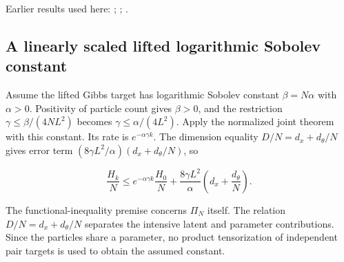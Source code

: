 \documentclass[11pt,a4paper]{report}
\begin{document}
Earlier results used here: \cite[Section~3.1.3]{LangevinLean2026ULALSI}; \cite[Section~3.1.1]{LangevinLean2026IPLA}; \cite[Section~3.3.2]{LangevinLean2026IPLA}.
\subsection{\texorpdfstring{A linearly scaled lifted logarithmic Sobolev constant}{A linearly scaled lifted logarithmic Sobolev constant}}
\label{report-step-IPLA-LSI-UnconditionalTheorem-lean-3}


Assume the lifted Gibbs target has logarithmic Sobolev constant \(\beta=N\alpha\) with \(\alpha>0\). Positivity of particle count gives \(\beta>0\), and the restriction \(\gamma\le\beta/(4NL^2)\) becomes \(\gamma\le\alpha/(4L^2)\). Apply the normalized joint theorem with this constant. Its rate is \(e^{-\alpha\gamma k}\). The dimension equality \(D/N=d_x+d_\theta/N\) gives error term \((8\gamma L^2/\alpha)(d_x+d_\theta/N)\), so

\[\frac{H_k}{N}\le e^{-\alpha\gamma k}\frac{H_0}{N}+\frac{8\gamma L^2}{\alpha}\left(d_x+\frac{d_\theta}{N}\right).\]

The functional-inequality premise concerns \(\Pi_N\) itself. The relation \(D/N=d_x+d_\theta/N\) separates the intensive latent and parameter contributions. Since the particles share a parameter, no product tensorization of independent pair targets is used to obtain the assumed constant.
\end{document}
